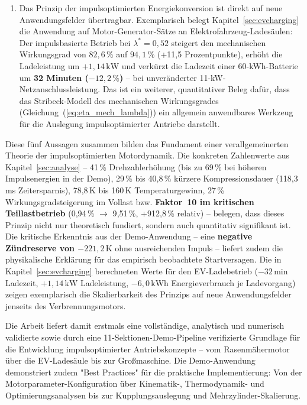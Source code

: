 ﻿\documentclass[a4paper,12pt]{article}
\begin{document}
\begin{enumerate}
	\item Das Prinzip der impulsoptimierten Energiekonversion ist direkt
	auf neue Anwendungsfelder übertragbar. Exemplarisch belegt Kapitel~\ref{sec:evcharging}
	die Anwendung auf Motor-Generator-Sätze an Elektrofahrzeug-Ladesäulen:
	Der impulsbasierte Betrieb bei $\lambda^* = 0{,}52$ steigert den
	mechanischen Wirkungsgrad von $82{,}6\,\%$ auf $94{,}1\,\%$
	(+11{,}5 Prozentpunkte), erhöht die Ladeleistung um $+1{,}14\,\text{kW}$
	und verkürzt die Ladezeit einer 60-kWh-Batterie um
	\textbf{32 Minuten ($-12{,}2\,\%$)} -- bei unveränderter
	11-kW-Netzanschlussleistung. Das ist ein weiterer, quantitativer Beleg
	dafür, dass das Stribeck-Modell des mechanischen Wirkungsgrades
	(Gleichung~(\ref{eq:eta_mech_lambda})) ein allgemein anwendbares
	Werkzeug für die Auslegung impulsoptimierter Antriebe darstellt.
\end{enumerate}

Diese fünf Aussagen zusammen bilden das Fundament einer verallgemeinerten
Theorie der impulsoptimierten Motordynamik. Die konkreten Zahlenwerte aus
Kapitel~\ref{sec:analyse} -- 41\,\% Drehzahlerhöhung (bis zu 69\,\% bei
höheren Impulsenergien in der Demo), 29\,\% bis 40{,}8\,\% kürzere
Kompressionsdauer (118{,}3\,ms Zeitersparnis), 78{,}8\,K bis 160\,K
Temperaturgewinn, 27\,\% Wirkungsgradsteigerung im Vollast bzw.
\textbf{Faktor~10 im kritischen Teillastbetrieb} (0{,}94\,\%
$\rightarrow$ 9{,}51\,\%, +912{,}8\,\% relativ) -- belegen, dass dieses
Prinzip nicht nur theoretisch fundiert, sondern auch quantitativ signifikant
ist. Die kritische Erkenntnis aus der Demo-Anwendung -- eine
\textbf{negative Zündreserve von $-221{,}2\,\text{K}$} ohne ausreichenden
Impuls -- liefert zudem die physikalische Erklärung für das empirisch
beobachtete Startversagen. Die in Kapitel~\ref{sec:evcharging} berechneten
Werte für den EV-Ladebetrieb ($-32\,\text{min}$ Ladezeit, $+1{,}14\,\text{kW}$
Ladeleistung, $-6{,}0\,\text{kWh}$ Energieverbrauch je Ladevorgang)
zeigen exemplarisch die Skalierbarkeit des Prinzips auf neue Anwendungsfelder
jenseits des Verbrennungsmotors.

Die Arbeit liefert damit erstmals eine vollständige, analytisch und numerisch
validierte sowie durch eine 11-Sektionen-Demo-Pipeline verifizierte Grundlage
für die Entwicklung impulsoptimierter Antriebskonzepte -- vom Rasenmähermotor
über die EV-Ladesäule bis zur Großmaschine. Die Demo-Anwendung demonstriert
zudem "Best Practices" für die praktische Implementierung: Von der Motorparameter-Konfiguration
über Kinematik-, Thermodynamik- und Optimierungsanalysen bis zur Kupplungsauslegung
und Mehrzylinder-Skalierung.
\end{document}
